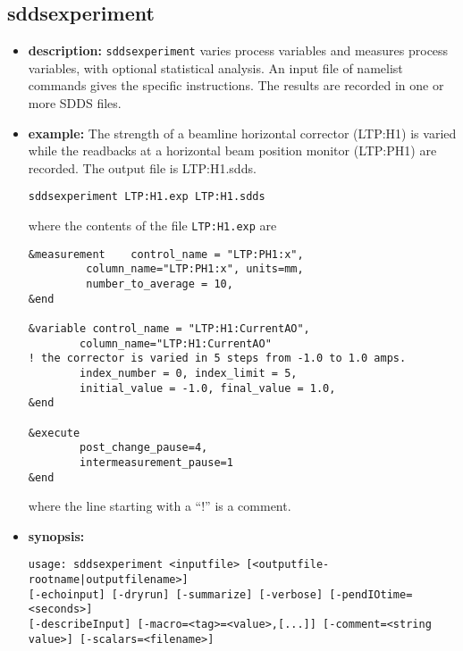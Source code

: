 %
%
\begin{latexonly}
\newpage
\end{latexonly}

%
%
\subsection{sddsexperiment}
\label{sddsexperiment}

\begin{itemize}
\item {\bf description:}
%
%
\verb+sddsexperiment+ varies process variables and measures process variables, with optional statistical analysis.
An input file of namelist commands gives the specific instructions. 
The results are recorded in one or more SDDS files.
\item {\bf example:} 
%
% 
%
The strength of a beamline horizontal corrector (LTP:H1) is varied while the readbacks at a horizontal beam position
monitor (LTP:PH1) are recorded. The output file is LTP:H1.sdds.
\begin{verbatim}
sddsexperiment LTP:H1.exp LTP:H1.sdds
\end{verbatim}
where the contents of the file \verb+LTP:H1.exp+ are
\begin{verbatim}
&measurement    control_name = "LTP:PH1:x",
         column_name="LTP:PH1:x", units=mm,
         number_to_average = 10,
&end

&variable control_name = "LTP:H1:CurrentAO",
        column_name="LTP:H1:CurrentAO"
! the corrector is varied in 5 steps from -1.0 to 1.0 amps.
        index_number = 0, index_limit = 5,
        initial_value = -1.0, final_value = 1.0,
&end
        
&execute
        post_change_pause=4,
        intermeasurement_pause=1
&end
\end{verbatim}

where the line starting with a ``!'' is a comment.
\item {\bf synopsis:} 
%
%
\begin{verbatim}
usage: sddsexperiment <inputfile> [<outputfile-rootname|outputfilename>]
[-echoinput] [-dryrun] [-summarize] [-verbose] [-pendIOtime=<seconds>]
[-describeInput] [-macro=<tag>=<value>,[...]] [-comment=<string value>] [-scalars=<filename>]
\end{verbatim}


\end{itemize}
